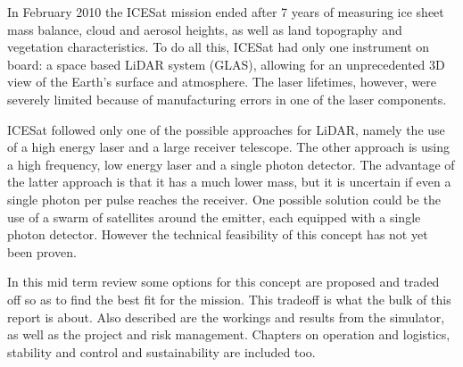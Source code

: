 In February 2010 the ICESat mission ended after 7 years of measuring ice sheet mass balance, cloud and aerosol heights, as well as land topography and vegetation characteristics.
To do all this, ICESat had only one instrument on board: a space based \ac{LiDAR} system (\ac{GLAS}), allowing for an unprecedented 3D view of the Earth's surface and atmosphere.
The laser lifetimes, however, were severely limited because of manufacturing errors in one of the laser components.

ICESat followed only one of the possible approaches for \ac{LiDAR}, namely the use of a high energy laser and a large receiver telescope. The other approach is using a high frequency, low energy laser and a single photon detector. The advantage of the latter approach is that it has a much lower mass, but it is uncertain if even a single photon per pulse reaches the receiver. One possible solution could be the use of a swarm of satellites around the emitter, each equipped with a single photon detector. However the technical feasibility of this concept has not yet been proven.

In this mid term review some options for this concept are proposed and traded off so as to find the best fit for the mission. This tradeoff is what the bulk of this report is about. Also described are the workings and results from the simulator, as well as the project and risk management. Chapters on operation and logistics, stability and control and sustainability are included too.

